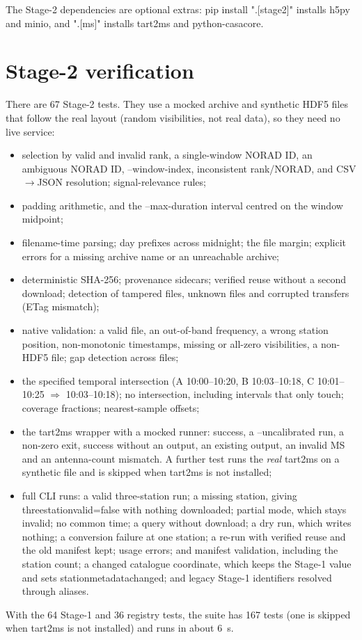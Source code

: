 \documentclass[11pt,a4paper]{article}
\newcommand{\code}[1]{{\ttfamily\def\_{\textunderscore\allowbreak}#1}}
\begin{document}
The Stage-2 dependencies are optional extras: \code{pip install
".[stage2]"} installs \code{h5py} and \code{minio}, and \code{".[ms]"}
installs \code{tart2ms} and python-casacore.

\section{Stage-2 verification}

There are 67 Stage-2 tests. They use a mocked archive and synthetic HDF5
files that follow the real layout (random visibilities, not real data), so
they need no live service:
\begin{itemize}
\item selection by valid and invalid rank, a single-window NORAD ID, an
ambiguous NORAD ID, \code{--window-index}, inconsistent rank/NORAD, and
CSV$\to$JSON resolution; signal-relevance rules;
\item padding arithmetic, and the \code{--max-duration} interval centred on
the window midpoint;
\item filename-time parsing; day prefixes across midnight; the file margin;
explicit errors for a missing archive name or an unreachable archive;
\item deterministic SHA-256; provenance sidecars; verified reuse without a
second download; detection of tampered files, unknown files and corrupted
transfers (ETag mismatch);
\item native validation: a valid file, an out-of-band frequency, a wrong
station position, non-monotonic timestamps, missing or all-zero
visibilities, a non-HDF5 file; gap detection across files;
\item the specified temporal intersection (A 10:00--10:20, B 10:03--10:18,
C 10:01--10:25 $\Rightarrow$ 10:03--10:18); no intersection, including
intervals that only touch; coverage fractions; nearest-sample offsets;
\item the \code{tart2ms} wrapper with a mocked runner: success, a
\code{--uncalibrated} run, a non-zero exit, success without an output, an
existing output, an invalid MS and an antenna-count mismatch. A further test
runs the \emph{real} \code{tart2ms} on a synthetic file and is skipped when
\code{tart2ms} is not installed;
\item full CLI runs: a valid three-station run; a missing station, giving
\code{three\_station\_valid=false} with nothing downloaded; partial mode,
which stays invalid; no common time; a query without download; a dry run,
which writes nothing; a conversion failure at one station; a re-run with
verified reuse and the old manifest kept; usage errors; and manifest
validation, including the station count; a changed catalogue coordinate,
which keeps the Stage-1 value and sets \code{station\_metadata\_changed};
and legacy Stage-1 identifiers resolved through aliases.
\end{itemize}
With the 64 Stage-1 and 36 registry tests, the suite has 167 tests (one is
skipped when \code{tart2ms} is not installed) and runs in about
\SI{6}{\second}.
\end{document}
